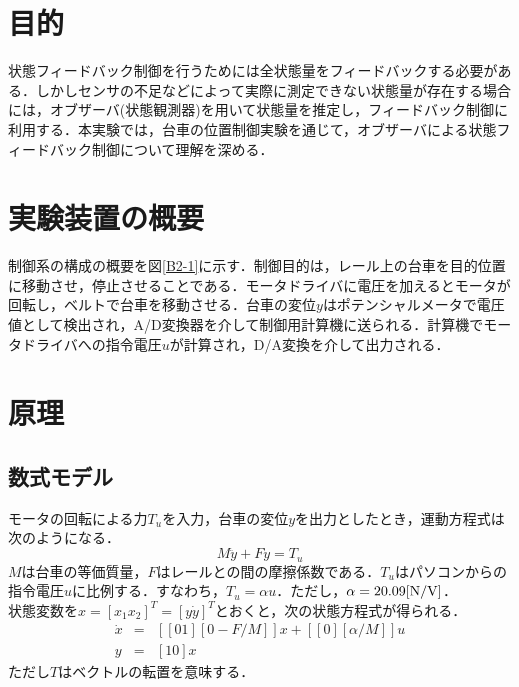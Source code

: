 \documentclass[12pt]{jsarticle}
\begin{document}
\section{目的}
状態フィードバック制御を行うためには全状態量をフィードバックする必要がある．しかしセンサの不足などによって実際に測定できない状態量が存在する場合には，オブザーバ(状態観測器)を用いて状態量を推定し，フィードバック制御に利用する．本実験では，台車の位置制御実験を通じて，オブザーバによる状態フィードバック制御について理解を深める．
\section{実験装置の概要}
制御系の構成の概要を図\ref{B2-1}に示す．制御目的は，レール上の台車を目的位置に移動させ，停止させることである．モータドライバに電圧を加えるとモータが回転し，ベルトで台車を移動させる．台車の変位$y$はポテンシャルメータで電圧値として検出され，A/D変換器を介して制御用計算機に送られる．計算機でモータドライバへの指令電圧$u$が計算され，D/A変換を介して出力される．
\section{原理}
\subsection{数式モデル}
モータの回転による力$T_u$を入力，台車の変位$y$を出力としたとき，運動方程式は次のようになる．
\begin{equation}
  \label{Equation-B2-1}
  M\ddot{y} + F\dot{y} = T_u
\end{equation}
$M$は台車の等価質量，$F$はレールとの間の摩擦係数である．$T_u$はパソコンからの指令電圧$u$に比例する．すなわち，$T_u=\alpha u$．ただし，$\alpha = 20.09{\rm [N/V]}$．\\
状態変数を$x=[x_1 x_2]^T = [y \dot{y}]^T$とおくと，次の状態方程式が得られる．
\begin{eqnarray}
  \label{Equation-B2-2}
  \dot{x} &=& \left[[ 0 1 ][0 -F/M]\right] x + \left[[0][\alpha/M]\right] u \\ \nonumber
  y &=& [1 0] x
\end{eqnarray}
ただし$T$はベクトルの転置を意味する．
\end{document}
